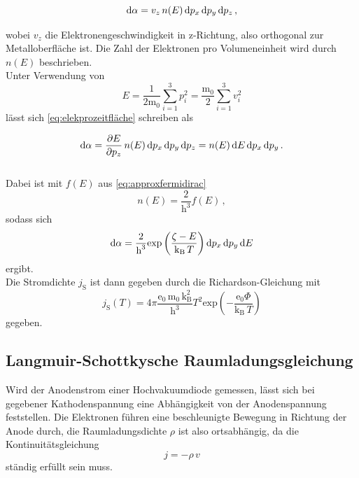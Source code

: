 \begin{equation}
    \mathrm{d} \alpha = v_z \, n(E) \, \mathrm{d} p_x \, \mathrm{d} p_y \, \mathrm{d} p_z \,,
    \label{eq:elekprozeitfläche}
\end{equation}

wobei $v_z$ die Elektronengeschwindigkeit in z-Richtung,
also orthogonal zur Metalloberfläche ist.
Die Zahl der Elektronen pro Volumeneinheit wird durch $n(E)$ beschrieben. \\

Unter Verwendung von
\begin{equation*}
    E = \dfrac{1}{2 \text{m}_0} \sum_{i=1}^3 p^2_i = \dfrac{\text{m}_0}{2} \sum_{i=1}^3 v^2_i
\end{equation*}
lässt sich \eqref{eq:elekprozeitfläche} schreiben als

\begin{equation}
    \mathrm{d} \alpha = \dfrac{\partial E}{\partial p_z} \, n(E) \, \mathrm{d} p_x \, \mathrm{d} p_y 
    \, \mathrm{d} p_{z} = n(E) \, \mathrm{d} E \, \mathrm{d} p_x \, \mathrm{d} p_y \,.
    \label{eq:dalphaE}
\end{equation} \\

Dabei ist mit $f(E)$ aus \eqref{eq:approxfermidirac}
\begin{equation*}
    n(E) = \dfrac{2}{\text{h}^3} f(E) \,,
\end{equation*}
sodass sich
\begin{equation*}
    \mathrm{d} \alpha = \dfrac{2}{\text{h}^3} \text{exp} \left(\dfrac{\zeta - E}{\text{k}_\text{B} \, T} \right)
                    \mathrm{d} p_x \, \mathrm{d} p_y \, \mathrm{d} E
\end{equation*}
ergibt. \\

Die Stromdichte $j_\text{S}$ ist dann gegeben durch die Richardson-Gleichung mit
\begin{equation}
    j_\text{S} (T) = 4 \pi \dfrac{\text{e}_0 \, \text{m}_0 \, \text{k}^2_\text{B}}{\text{h}^3}
                     T^2 \text{exp} \left(- \dfrac{\text{e}_0 \Phi}{\text{k}_\text{B} \, T}\right)
    \label{eq:stromdichte}
\end{equation}
gegeben.


\subsection{Langmuir-Schottkysche Raumladungsgleichung}

Wird der Anodenstrom einer Hochvakuumdiode gemessen, lässt sich 
bei gegebener Kathodenspannung eine Abhängigkeit von der Anodenspannung feststellen.
Die Elektronen führen eine beschleunigte Bewegung in Richtung der Anode durch,
die Raumladungsdichte $\rho$ ist also ortsabhängig, da die 
Kontinuitätsgleichung
\begin{equation}
    j = - \rho \, v
    \label{eq:kontiglei}
\end{equation}
ständig erfüllt sein muss. \\

